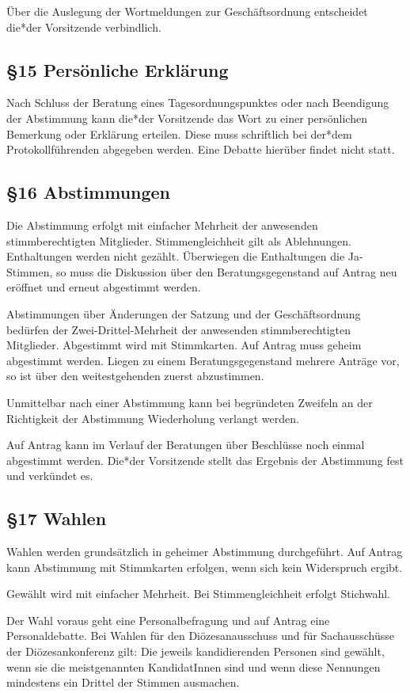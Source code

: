 \documentclass[12pt]{report}
\begin{document}
\begin{flushleft}
Über die Auslegung der Wortmeldungen zur Geschäftsordnung entscheidet die*der Vorsitzende verbindlich.


\subsection*{§15 Persönliche Erklärung}
Nach Schluss der Beratung eines Tagesordnungspunktes oder nach Beendigung der Abstimmung kann die*der
Vorsitzende das Wort zu einer persönlichen Bemerkung oder Erklärung erteilen. Diese muss schriftlich bei
der*dem Protokollführenden abgegeben werden. Eine Debatte hierüber findet nicht statt.
\subsection*{§16 Abstimmungen}
Die Abstimmung erfolgt mit einfacher Mehrheit der anwesenden stimmberechtigten Mitglieder.
Stimmengleichheit gilt als Ablehnungen. Enthaltungen werden nicht gezählt. Überwiegen die Enthaltungen die 
Ja-Stimmen, so muss die Diskussion über den Beratungsgegenstand auf Antrag neu eröffnet und erneut
abgestimmt werden.

Abstimmungen über Änderungen der Satzung und der Geschäftsordnung bedürfen der
Zwei-Drittel-Mehrheit der anwesenden stimmberechtigten Mitglieder. Abgestimmt wird mit Stimmkarten.
Auf Antrag muss geheim abgestimmt werden.
Liegen zu einem Beratungsgegenstand mehrere Anträge vor, so ist über den weitestgehenden zuerst abzustimmen.

Unmittelbar nach einer Abstimmung kann bei begründeten Zweifeln an der Richtigkeit der Abstimmung 
Wiederholung verlangt werden.

Auf Antrag kann im Verlauf der Beratungen über Beschlüsse noch einmal abgestimmt werden.
Die*der Vorsitzende stellt das Ergebnis der Abstimmung fest und verkündet es.

\subsection*{§17 Wahlen}
Wahlen werden grundsätzlich in geheimer Abstimmung durchgeführt. Auf Antrag kann Abstimmung mit
Stimmkarten erfolgen, wenn sich kein Widerspruch ergibt.

Gewählt wird mit einfacher Mehrheit. Bei Stimmengleichheit erfolgt Stichwahl.

Der Wahl voraus geht eine Personalbefragung und auf Antrag eine Personaldebatte. Bei Wahlen für den 
Diözesanausschuss und für Sachausschüsse der Diözesankonferenz gilt: Die jeweils kandidierenden Personen
sind gewählt, wenn sie die meistgenannten KandidatInnen sind und wenn diese Nennungen mindestens ein
Drittel der Stimmen ausmachen.


\end{flushleft}
\end{document}
